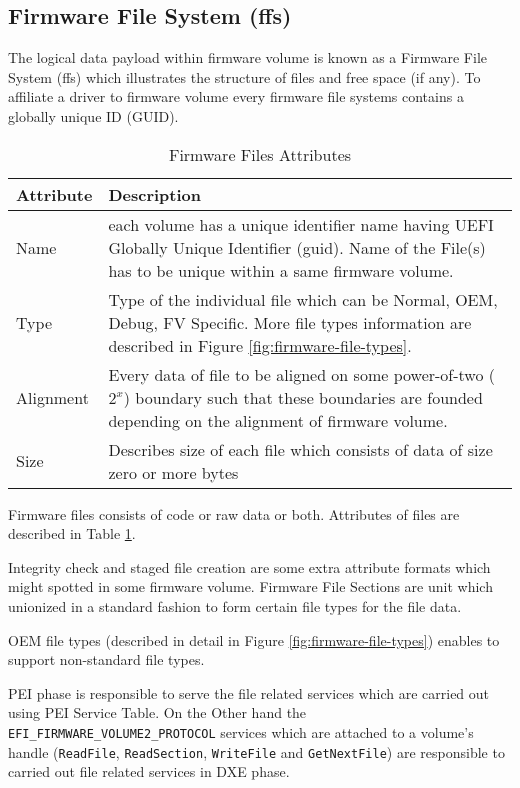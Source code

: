\subsection{Firmware File System (\gls{ffs})}
The logical data payload within firmware volume is known as a Firmware File System (\gls{ffs}) which illustrates the structure of files and free space (if any). To affiliate a driver to firmware volume every firmware file systems contains a globally unique ID (GUID).


\begin{table}[h]
	\centering
	\renewcommand{\arraystretch}{2}
	\caption{Firmware Files Attributes}\label{table:firmware-files-attributes}
	\begin{tabular}{p{4cm} | p{11cm}}
		\textbf{Attribute} & \textbf{Description}
		\\ \hline \hline
		Name & each volume has a unique identifier name having UEFI Globally Unique Identifier (\gls{guid}). Name of the File(s) has to be unique within a same firmware volume.
		\\ \hline
		Type & Type of the individual file which can be Normal, OEM, Debug, FV Specific. More file types information are described in Figure \ref{fig:firmware-file-types}.
		\\ \hline
		Alignment & Every data of file to be aligned on some power-of-two ($ 2^x $) boundary such that these boundaries are founded depending on the alignment of firmware volume.
		\\ \hline
		Size & Describes size of each file which consists of data of size zero or more bytes
		\\ \hline
	\end{tabular}
\end{table}

Firmware files consists of code or raw data or both. Attributes of files are described in Table \ref{table:firmware-files-attributes}.

Integrity check and staged file creation are some extra attribute formats which might spotted in some firmware volume. Firmware File Sections are unit which unionized in a standard fashion to form certain file types for the file data.

OEM file types (described in detail in Figure \ref{fig:firmware-file-types}) enables to support non-standard file types.

PEI phase is responsible to serve the file related services which are carried out using PEI Service Table. On the Other hand the \\ \verb|EFI_FIRMWARE_VOLUME2_PROTOCOL| services which are attached to a volume's handle (\verb|ReadFile|, \verb|ReadSection|, \verb|WriteFile| and \verb|GetNextFile|) are responsible to carried out file related services in DXE phase.

